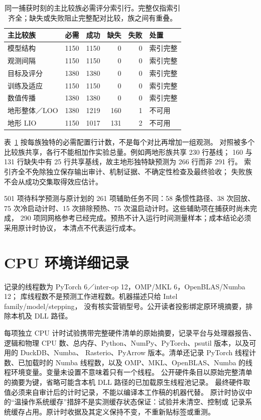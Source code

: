 \begin{table}[htbp]
\centering\small
\caption{同一捕获时刻的主比较族必需评分索引行。完整仅指索引齐全；缺失或失败阻止完整配对比较，族之间有重叠。}
\label{tab:family-coverage}\hypertarget{tab:family-coverage}{}
\begin{tabular}{@{}lrrrrl@{}}
\toprule
主比较族 & 必需 & 成功 & 缺失 & 失败 & 处置\\
\midrule
模型结构 & 1150 & 1150 & 0 & 0 & 索引完整\\
观测间隔 & 1150 & 1150 & 0 & 0 & 索引完整\\
目标及评分 & 1380 & 1380 & 0 & 0 & 索引完整\\
训练及适应 & 1150 & 1150 & 0 & 0 & 索引完整\\
数值传播 & 1380 & 1380 & 0 & 0 & 索引完整\\
地形整体／LOO & 1380 & 1219 & 160 & 1 & 不可用\\
地形 LIO & 1150 & 1017 & 131 & 2 & 不可用\\
\bottomrule
\end{tabular}
\end{table}

表~\ref{tab:family-coverage} 按每族独特的必需配置行计数，不是每个对比再增加一组观测。
对照被多个比较族共享，各行不能相加作实验总量。例如两地形族共享 230 行基线；
160 与 131 行缺失中有 25 行共享基线，故主地形独特缺预测为 266 行而非 291 行。
索引齐全不免除独立保存输出审计、机制证据、不确定性检查及最终验收；
失败族不会从成功交集取得效应估计。

501 项待科学预测与原计划的 261 项辅助任务不同：58 条惯性路径、38 次回放、
75 次冷启动计时、15 次排除预热、75 次温启动计时。这些辅助项在捕获时尚未完成，
290 项同网格参考已经完成。预热不计入运行时间测量样本；成本结论必须采用原计时协议，
本清点不代表运行成本。



\Needspace{.70\textheight}

\Needspace{.70\textheight}



\section{CPU 环境详细记录}
\label{sec:runtime-record-details}\hypertarget{sec:runtime-record-details}{}
记录的线程数为 PyTorch 6／inter-op 12，OMP/MKL 6，OpenBLAS/Numba 12；
库线程数不是预测工作进程数。机器描述只给 Intel family/model/stepping，
没有核实营销型号。公开读者投影绑定原环境摘要，排除本机及 DLL 路径。

每项独立 CPU 计时试验携带完整硬件清单的原始摘要，记录平台与处理器报告、逻辑和物理
CPU 数、总内存、Python、NumPy、PyTorch、psutil 版本，以及可用的 DuckDB、Numba、
Rasterio、PyArrow 版本。清单还记录 PyTorch 线程计数、已加载时的 Numba 线程数，以及
OMP、MKL、OpenBLAS、Numba 的线程环境变量。变量未设置不意味着只有一个线程。
公开硬件条目以原始完整清单的摘要为键，省略可能含本机 DLL 路径的已加载原生线程池记录。
最终硬件取值必须来自审计后的计时记录，不能以编译本工作稿的机器代替。
原计时协议中的“温操作系统缓存”措辞不是实测缓存状态保证：试验并未清空、控制或
记录系统缓存占用。原计时收据及其定义保持不变，不重新贴标签或重测。


